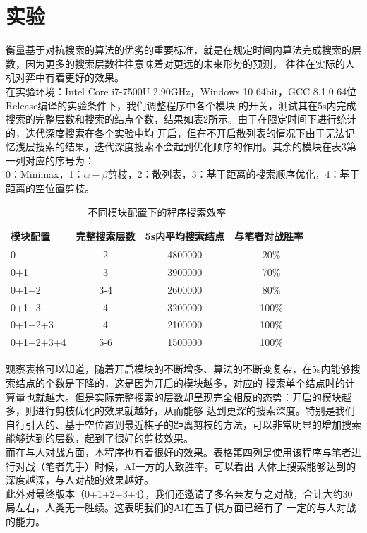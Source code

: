 \documentclass{acm_proc_article-sp}
\begin{document}
\section{\textbf{实验}}
衡量基于对抗搜索的算法的优劣的重要标准，就是在规定时间内算法完成搜索的层数，因为更多的搜索层数往往意味着对更远的未来形势的预测，
往往在实际的人机对弈中有着更好的效果。\\
在实验环境：Intel Core i7-7500U 2.90GHz，Windows 10 64bit，GCC 8.1.0 64位Release编译的实验条件下，我们调整程序中各个模块
的开关，测试其在5s内完成搜索的完整层数和搜索的结点个数，结果如表2所示。由于在限定时间下进行统计的，迭代深度搜索在各个实验中均
开启，但在不开启散列表的情况下由于无法记忆浅层搜索的结果，迭代深度搜索不会起到优化顺序的作用。其余的模块在表3第一列对应的序号为：\\
0：Minimax，1：$\alpha-\beta$剪枝，2：散列表，3：基于距离的搜索顺序优化，4：基于距离的空位置剪枝。
\begin{table}
    \centering
    \caption{不同模块配置下的程序搜索效率}
    \begin{tabular}{|l|c|c|c|} \hline
    模块配置 & 完整搜索层数 & 5s内平均搜索结点 & 与笔者对战胜率\\ \hline
    0 & 2 & 4800000 & ~20\% \\ \hline
    0+1 & 3 & 3900000 & ~70\% \\ \hline
    0+1+2 & 3-4 & 2600000 & ~80\% \\ \hline
    0+1+3 & 4 & 3200000 & ~100\% \\ \hline
    0+1+2+3 & 4 & 2100000 & ~100\% \\ \hline
    0+1+2+3+4 & 5-6 & 1500000 & ~100\% \\ \hline
    \end{tabular}
\end{table}
观察表格可以知道，随着开启模块的不断增多、算法的不断变复杂，在5s内能够搜索结点的个数是下降的，这是因为开启的模块越多，对应的
搜索单个结点时的计算量也就越大。但是实际完整搜索的层数却呈现完全相反的态势：开启的模块越多，则进行剪枝优化的效果就越好，从而能够
达到更深的搜索深度。特别是我们自行引入的、基于空位置到最近棋子的距离剪枝的方法，可以非常明显的增加搜索能够达到的层数，起到了很好的剪枝效果。\\
而在与人对战方面，本程序也有着很好的效果。表格第四列是使用该程序与笔者进行对战（笔者先手）时候，AI一方的大致胜率。可以看出
大体上搜索能够达到的深度越深，与人对战的效果越好。\\
此外对最终版本（0+1+2+3+4），我们还邀请了多名亲友与之对战，合计大约30局左右，人类无一胜绩。这表明我们的AI在五子棋方面已经有了
一定的与人对战的能力。
\end{document}
